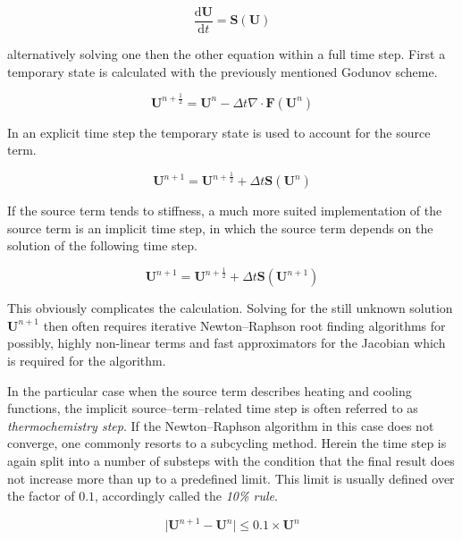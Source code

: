 \begin{equation}
  \frac{\mathrm{d}\textbf{U}}{\mathrm{d}t} = \textbf{S}(\textbf{U})
\end{equation}

alternatively solving one then the other equation within a full time step.
First a temporary state is calculated with the previously mentioned Godunov scheme.

\begin{equation}
  \textbf{U}^{n+\frac{1}{2}} = \textbf{U}^{n} - \Delta t \nabla \cdot \textbf{F}(\textbf{U}^{n})
\end{equation}

In an explicit time step the temporary state is used to account for the source term.

\begin{equation}
  \textbf{U}^{n+1} = \textbf{U}^{n+\frac{1}{2}} + \Delta t \textbf{S}(\textbf{U}^{n})
\end{equation}

If the source term tends to stiffness, a much more suited implementation of the source term is an implicit time step, in which the source term depends on the solution of the following time step.

\begin{equation}
  \textbf{U}^{n+1} = \textbf{U}^{n+\frac{1}{2}} + \Delta t \textbf{S}(\textbf{U}^{n+1})
\end{equation}

This obviously complicates the calculation.
Solving for the still unknown solution $\textbf{U}^{n+1}$ then often requires iterative Newton--Raphson root finding algorithms for possibly, highly non-linear terms and fast approximators for the Jacobian which is required for the algorithm.

In the particular case when the source term describes heating and cooling functions, the implicit source--term--related time step is often referred to as \textit{thermochemistry step}.
If the Newton--Raphson algorithm in this case does not converge, one commonly resorts to a subcycling method.
Herein the time step is again split into a number of substeps with the condition that the final result does not increase more than up to a predefined limit.
This limit is usually defined over the factor of $0.1$, accordingly called the \textit{10\% rule}.

\begin{equation}
  \vert \textbf{U}^{n+1}-\textbf{U}^{n}\vert \leq 0.1\times\textbf{U}^{n}
\end{equation}

